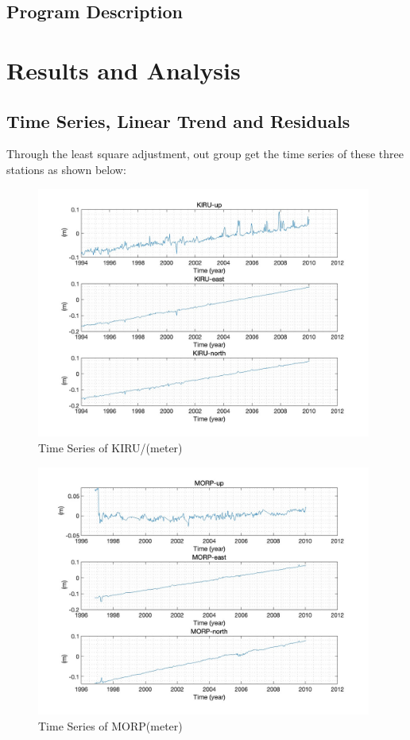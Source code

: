 \documentclass{article}
\begin{document}
\subsection{Program Description}

\section{Results and Analysis}
\subsection{Time Series, Linear Trend and Residuals}
Through the least square adjustment, out group get the time series of these three stations as shown below:
\begin{figure}[htbp]
  \centering
  \includegraphics[width=11cm]{../result/re_figure/fig_kiru/5.jpg}
  \captionsetup{skip=0.2cm}
  \caption{Time Series of KIRU/(meter)}
  \label{fig:Ori_KIRU}
\end{figure}
\begin{figure}[htbp]
  \centering
  \includegraphics[width=11cm]{../result/re_figure/fig_MORP/5.jpg}
  \caption{Time Series of MORP(meter)}
  \label{fig:Ori_MORP}
\end{figure}
\end{document}
